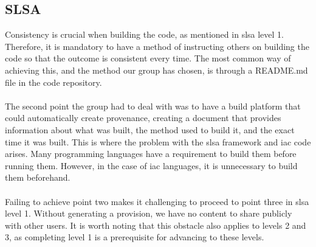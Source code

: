 \subsection{SLSA}
Consistency is crucial when building the code, as mentioned in \acrshort{slsa} level 1. Therefore, it is mandatory to have a method of instructing others on building the code so that the outcome is consistent every time. The most common way of achieving this, and the method our group has chosen, is through a README.md file in the code repository. 
\\~\\
The second point the group had to deal with was to have a build platform that could automatically create \gls{provenance}, creating a document that provides information about what was built, the method used to build it, and the exact time it was built. This is where the problem with the \acrshort{slsa} framework and \acrshort{iac} code arises. Many programming languages have a requirement to build them before running them. However, in the case of \acrshort{iac} languages, it is unnecessary to build them beforehand.
\\~\\
Failing to achieve point two makes it challenging to proceed to point three in \acrshort{slsa} level 1. Without generating a provision, we have no content to share publicly with other users. It is worth noting that this obstacle also applies to levels 2 and 3, as completing level 1 is a prerequisite for advancing to these levels.

